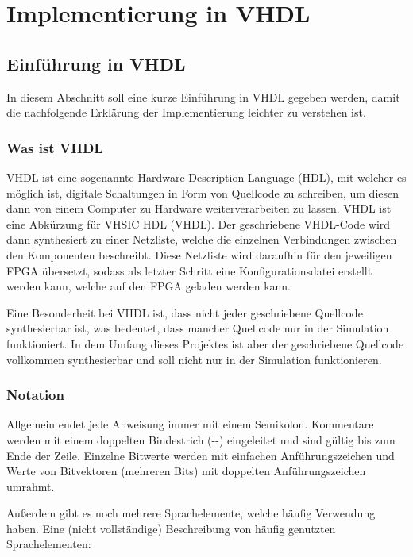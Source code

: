 \chapter{Implementierung in VHDL}
\label{c:vhdl}
\section{Einführung in VHDL}
In diesem Abschnitt soll eine kurze Einführung in VHDL gegeben werden, damit die
nachfolgende Erklärung der Implementierung leichter zu verstehen ist.

\subsection{Was ist VHDL}
VHDL ist eine sogenannte Hardware Description Language (HDL), mit welcher es möglich ist, digitale
Schaltungen in Form von Quellcode zu schreiben, um diesen dann von einem
Computer zu Hardware weiterverarbeiten zu lassen. VHDL ist eine Abkürzung für
VHSIC HDL (\acl{VHDL}). Der geschriebene VHDL-Code wird dann synthesiert zu
einer Netzliste, welche die einzelnen Verbindungen zwischen den Komponenten
beschreibt. Diese Netzliste wird daraufhin für den jeweiligen \ac{FPGA}
übersetzt, sodass als letzter Schritt eine Konfigurationsdatei erstellt werden
kann, welche auf den \ac{FPGA} geladen werden kann.

Eine Besonderheit bei VHDL ist, dass nicht jeder geschriebene Quellcode
synthesierbar ist, was bedeutet, dass mancher Quellcode nur in der Simulation
funktioniert. In dem Umfang dieses Projektes ist aber der geschriebene Quellcode
vollkommen synthesierbar und soll nicht nur in der Simulation funktionieren.

\subsection{Notation}
Allgemein endet jede Anweisung immer mit einem Semikolon. Kommentare werden mit
einem doppelten Bindestrich (-{}-) eingeleitet und sind gültig bis zum Ende der
Zeile. Einzelne Bitwerte werden mit einfachen Anführungszeichen und Werte
von Bitvektoren (mehreren Bits) mit doppelten Anführungszeichen umrahmt.

Außerdem gibt es noch mehrere Sprachelemente, welche häufig Verwendung
haben. Eine (nicht vollständige) Beschreibung von häufig genutzten
Sprachelementen:

